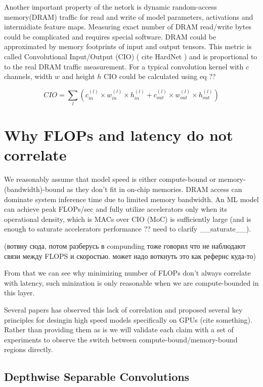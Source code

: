 Another important property of the netork is dynamic random-access memory(DRAM) traffic for read and write of model parameters, activations and intermidiate feature maps. Measuring exact number of DRAM read/write bytes could be complicated and requires special software. DRAM could be approximated by memory footprints of input and output tensors. This metric is called Convolutional Input/Output (CIO) ( cite HardNet ) and is proportional to to the real DRAM traffic measurement. For a typical convolution kernel with $c$ channels, width $w$ and height $h$ CIO could be calculated using eq ??

$$
C I O=\sum_{l}\left(c_{i n}^{(l)} \times w_{i n}^{(l)} \times h_{i n}^{(l)}+c_{o u t}^{(l)} \times w_{o u t}^{(l)} \times h_{o u t}^{(l)}\right)
$$



\section{Why FLOPs and latency do not correlate}

We reasonably assume that model speed is either compute-bound or memory-(bandwidth)-bound as they don't fit in on-chip memories. DRAM access can dominate system inference time due to limited memory bandwidth. An ML model can achieve peak FLOPs/sec and fully utilize accelerators only when its operational density, which is MACs over CIO (MoC) is sufficiently large (and is enough to saturate accelerators performance ?? need to clarify __saturate__). 

(вотвну сюда, потом разберусь в compunding тоже говорил что не наблюдают связи между FLOPS и скоростью. может надо воткнуть это как рефернс куда-то)

From that we can see why minimizing number of FLOPs don't always correlate with latency, such minization is only reasonable when we are compute-bounded in this layer. 

Several papers has observed this lack of correlation and proposed several key principles for desingin high speed models specifically on GPUs (cite something). Rather than providing them as is we will validate each claim with a set of experiments to observe the switch between compute-bound/memory-bound regions directly.

\subsection{Depthwise Separable Convolutions}

